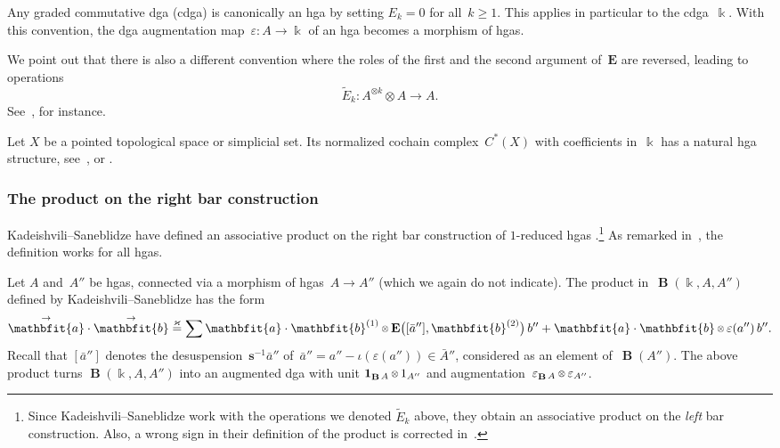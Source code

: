\documentclass[letterpaper]{amsart}
\numberwithin{equation}{section}
\theoremstyle{plain}
\theoremstyle{definition}
\theoremstyle{remark}
\let\epsilon\varepsilon
\def\smallotimes{\mathbin{\mkern-1mu\vcenter{\hbox{$\scriptstyle\otimes$}}\mkern-1mu}}
\DeclareMathOperator{\BB}{\mathbf{B}}
\def\kk{\Bbbk}
\def\BBone{\mathbf{1}}
\def\susp{\mathbf{s}}
\def\desusp{\susp^{-1}}
\def\aa{\mathbfit{a}}
\def\raa{\overset{\text{$\rightarrow$}}{\aa}}
\def\bb{\mathbfit{b}}
\def\rbb{\overset{\text{$\rightarrow$}}{\bb}}
\def\EE{\mathbf{E}}
\def\swee#1#2{#1^{(#2)}}
\let\KS\varkappa
\def\eqKS{\stackrel{\KS}{=}}
\begin{document}
Any graded commutative dga (cdga) is canonically an hga by setting $E_{k}=0$ for all~$k\ge1$.
This applies in particular to the cdga~$\kk$. With this convention, the dga augmentation map~$\epsilon\colon A\to\kk$
of an hga becomes a morphism of hgas.

We point out that there is also a different convention where the roles of the first and the second argument of~$\EE$
are reversed, leading to operations
\begin{equation}
  \label{eq:tilde-E}
  \tilde{E}_{k}\colon A^{\otimes k}\otimes A\to A.
\end{equation}
See~\cite[Sec.~7]{KadeishviliSaneblidze:2005}, for instance.

Let $X$ be a pointed topological space or simplicial set. Its normalized cochain complex~$C^{*}(X)$
with coefficients in~$\kk$ has a natural hga structure,
see~\cite[Sec.~2.3]{GerstenhaberVoronov:1995}, \cite[Sec~8.2]{Franz:homog} or .


\subsubsection{The product on the right bar construction}
\label{sec:prod-right-bar}

Kadeishvili--Saneblidze have defined an associative product on the right bar construction
of $1$-reduced hgas \cite[Cor.~6.2~\&~7.2]{KadeishviliSaneblidze:2005}.\footnote{%
  Since Kadeishvili--Saneblidze work with the operations we denoted $\tilde E_{k}$ above,
  they obtain an associative product on the \emph{left} bar construction. Also, a wrong sign
  in their definition of the product is corrected in~\cite[Rem.~2]{Saneblidze:2009}.}
As remarked in~\cite[Prop.~7.6]{Franz:homog}, the definition works for all hgas.
  
Let $A$ and~$A''$ be hgas, connected via a morphism of hgas~$A\to A''$ (which we again do not indicate).
The product in~$\BB(\kk,A,A'')$ defined by Kadeishvili--Saneblidze has the form
\begin{equation}
  \label{eq:def-prod-bar-right}
  \raa\cdot\rbb \eqKS \sum \aa\cdot\swee{\bb}{1} \smallotimes \EE\bigl([\bar a''],\swee{\bb}{2}\bigr)\,b''
  + \aa\cdot\bb\smallotimes \epsilon(a'')\,b''.
\end{equation}
Recall that $[\bar a'']$ denotes the desuspension~$\desusp\bar a''$ of~$\bar a''=a''-\iota(\epsilon(a''))\in\bar A''$,
considered as an element of~$\BB(A'')$.
The above product turns $\BB(\kk,A,A'')$ into an augmented dga with unit $\BBone_{\BB A}\smallotimes 1_{A''}$
and augmentation~$\epsilon_{\BB A}\smallotimes\epsilon_{A''}$.
\end{document}
